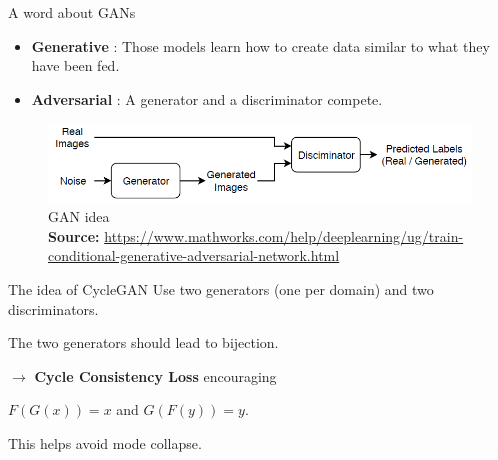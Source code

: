 \documentclass[12pt]{beamer}
\newcommand{\captionsource}[2]{
    \captionsetup{justification=centering}
    \caption*{#1\\\scriptsize\textbf{Source:} \url{#2}}
}
\begin{document}
    \begin{frame}{A word about GANs}
        \begin{itemize}
            \item \textbf{Generative} : Those models learn how to create data similar to what they have been fed.
            \item \textbf{Adversarial} : A generator and a discriminator compete.
        \end{itemize}

        \begin{figure}
            \centering
            \includegraphics[scale=0.3]{resources/cycle-gan/gan-principles.png}
            \captionsource{GAN idea}{https://www.mathworks.com/help/deeplearning/ug/train-conditional-generative-adversarial-network.html}
        \end{figure}
    \end{frame}
    
    \begin{frame}{The idea of CycleGAN}
        Use two generators (one per domain) and two discriminators.
        
        The two generators should lead to bijection.
        
        $\longrightarrow$ \textbf{Cycle Consistency Loss} encouraging

        \begin{center}
            $F(G(x)) = x$ and $G(F(y)) = y$.
        \end{center}
        
        This helps avoid mode collapse.
    \end{frame}
    
\end{document}

